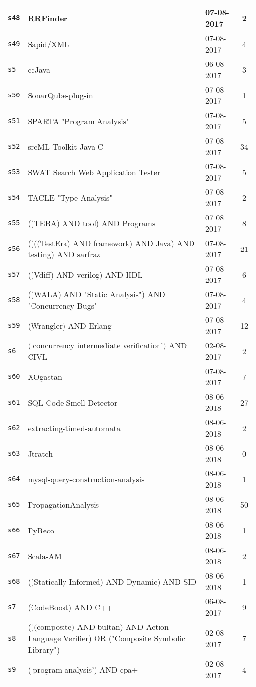 \begin{longtable}{| l | p{13cm} | l | c |}
    \hline
\texttt{s48} & RRFinder & 07-08-2017 & 2 \\
    \hline
\texttt{s49} & Sapid/XML & 07-08-2017 & 4 \\
    \hline
\texttt{s5} & ccJava & 06-08-2017 & 3 \\
    \hline
\texttt{s50} & SonarQube-plug-in & 07-08-2017 & 1 \\
    \hline
\texttt{s51} & SPARTA "Program Analysis" & 07-08-2017 & 5 \\
    \hline
\texttt{s52} & srcML Toolkit Java C & 07-08-2017 & 34 \\
    \hline
\texttt{s53} & SWAT Search Web Application Tester & 07-08-2017 & 5 \\
    \hline
\texttt{s54} & TACLE "Type Analysis" & 07-08-2017 & 2 \\
    \hline
\texttt{s55} & ((TEBA) AND tool) AND Programs & 07-08-2017 & 8 \\
    \hline
\texttt{s56} & ((((TestEra) AND framework) AND Java) AND testing) AND sarfraz & 07-08-2017 & 21 \\
    \hline
\texttt{s57} & ((Vdiff) AND verilog) AND HDL & 07-08-2017 & 6 \\
    \hline
\texttt{s58} & ((WALA) AND "Static Analysis") AND "Concurrency Bugs" & 07-08-2017 & 4 \\
    \hline
\texttt{s59} & (Wrangler) AND Erlang & 07-08-2017 & 12 \\
    \hline
\texttt{s6} & ('concurrency intermediate verification') AND CIVL & 02-08-2017 & 2 \\
    \hline
\texttt{s60} & XOgastan & 07-08-2017 & 7 \\
    \hline
\texttt{s61} & SQL Code Smell Detector & 08-06-2018 & 27 \\
    \hline
\texttt{s62} & extracting-timed-automata & 08-06-2018 & 2 \\
    \hline
\texttt{s63} & Jtratch & 08-06-2018 & 0 \\
    \hline
\texttt{s64} & mysql-query-construction-analysis & 08-06-2018 & 1 \\
    \hline
\texttt{s65} & PropagationAnalysis & 08-06-2018 & 50 \\
    \hline
\texttt{s66} & PyReco & 08-06-2018 & 1 \\
    \hline
\texttt{s67} & Scala-AM & 08-06-2018 & 2 \\
    \hline
\texttt{s68} & ((Statically-Informed) AND Dynamic) AND SID & 08-06-2018 & 1 \\
    \hline
\texttt{s7} & (CodeBoost) AND C++ & 06-08-2017 & 9 \\
    \hline
\texttt{s8} & (((composite) AND bultan) AND Action Language Verifier) OR ("Composite Symbolic Library") & 02-08-2017 & 7 \\
    \hline
\texttt{s9} & ('program analysis') AND cpa+ & 02-08-2017 & 4 \\
    \hline
  \hline
\end{longtable}
